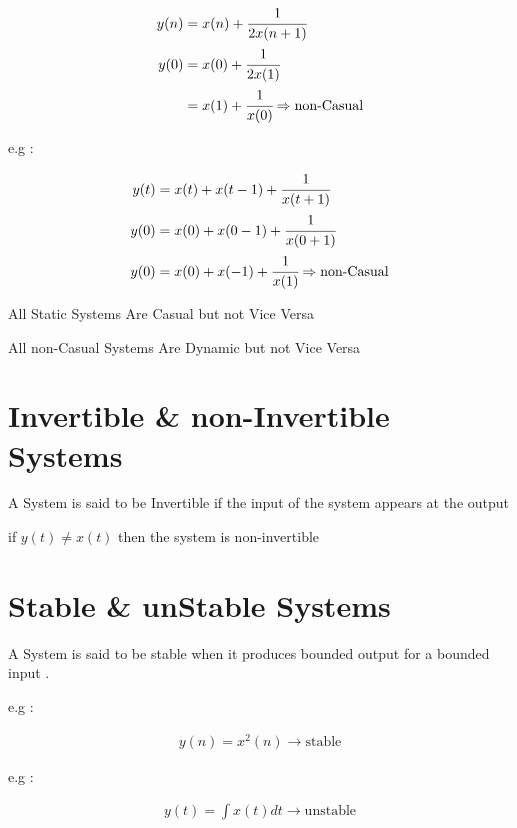 \documentclass[12pt]{article}
\begin{document}
\begin{align*}
y(n) &= x(n) + \cfrac{1}{2x(n+1)} \\
y(0) &= x(0) + \cfrac{1}{2x(1)} \\
&= x(1) + \cfrac{1}{x(0)} \Rightarrow \text{non-Casual}
\end{align*}


\noindent 
e.g : 


\begin{align*}
y(t) &= x(t) + x(t-1) + \cfrac{1}{x(t+1)} \\
y(0) &= x(0) + x(0-1) + \cfrac{1}{x(0+1)} \\
y(0) &= x(0) + x(-1) + \cfrac{1}{x(1)} \Rightarrow \text{non-Casual}
\end{align*}



\begin{tcolorbox}
All Static Systems Are Casual but not Vice Versa
\end{tcolorbox}

\begin{tcolorbox}
All non-Casual Systems Are Dynamic but not Vice Versa
\end{tcolorbox}



\section{Invertible \& non-Invertible Systems}


A System is said to be Invertible if the input of the system appears at the output 


\begin{center}
\end{center}


if $y(t) \neq x(t)$ then the system is non-invertible





\section{Stable \& unStable Systems}


A System is said to be stable when it produces bounded output for a bounded input .


e.g :

\begin{align*}
y(n) = x^{2}(n) \to \text{stable}
\end{align*}

e.g : 


\begin{align*}
y(t) = \int{x(t)dt} \to \text{unstable}
\end{align*}
\end{document}
